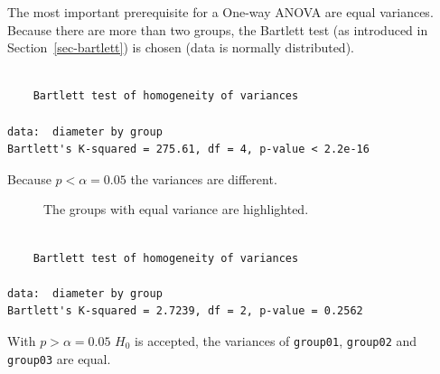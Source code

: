 \documentclass[
  a4paper,
]{scrbook}
\begin{document}
The most important prerequisite for a One-way ANOVA are equal variances.
Because there are more than two groups, the Bartlett test (as introduced
in Section~\ref{sec-bartlett}) is chosen (data is normally distributed).

\begin{verbatim}

    Bartlett test of homogeneity of variances

data:  diameter by group
Bartlett's K-squared = 275.61, df = 4, p-value < 2.2e-16
\end{verbatim}

Because \(p<\alpha = 0.05\) the variances are different.

\begin{figure}[H]


\caption{\label{fig-one-way-ANOVA-boxplot}The groups with equal variance
are highlighted.}

\end{figure}%

\begin{verbatim}

    Bartlett test of homogeneity of variances

data:  diameter by group
Bartlett's K-squared = 2.7239, df = 2, p-value = 0.2562
\end{verbatim}

With \(p>\alpha=0.05\) \(H_0\) is accepted, the variances of
\texttt{group01}, \texttt{group02} and \texttt{group03} are equal.
\end{document}
